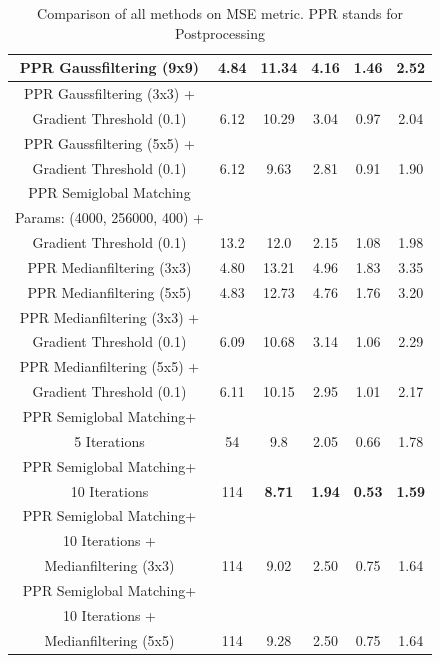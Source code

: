\documentclass  [
  paper    = a4,
  BCOR     = 10mm,
  twoside,
  fontsize = 12pt,
  fleqn,
  toc      = bibnumbered,
  toc      = listofnumbered,
  numbers  = noendperiod,
  headings = normal,
  listof   = leveldown,
  version  = 3.03
]                                       {scrreprt}
\begin{document}
\begin{table}
\begin{tabular}{|c|c|c|c|c|c|}
		PPR Gaussfiltering (9x9) & 4.84& 11.34 & 4.16 & 1.46 & 2.52 \\
		\hline
		PPR Gaussfiltering (3x3) +&&&&&\\
		 Gradient Threshold (0.1) & 6.12 & 10.29 & 3.04 & 0.97 &2.04\\
		\hline
		PPR Gaussfiltering (5x5) +&&&&&\\
		Gradient Threshold (0.1) & 6.12 & 9.63 & 2.81 & 0.91 & 1.90\\
		\hline
		PPR Semiglobal Matching&&&&&\\
		Params: (4000, 256000, 400) +&&&&&\\
		Gradient Threshold (0.1) & 13.2 &12.0 & 2.15 & 1.08 & 1.98\\
		\hline
		PPR Medianfiltering (3x3) & 4.80 & 13.21 & 4.96 & 1.83 & 3.35 \\
		\hline
		PPR Medianfiltering (5x5) & 4.83 & 12.73 & 4.76 & 1.76 & 3.20 \\
		\hline
		PPR Medianfiltering (3x3) +&&&&&\\
		Gradient Threshold (0.1) &6.09 & 10.68 & 3.14 & 1.06 & 2.29 \\
		\hline 
		PPR Medianfiltering (5x5) +&&&&&\\
		Gradient Threshold (0.1)  & 6.11& 10.15 & 2.95 & 1.01 &2.17 \\
		\hline
		PPR Semiglobal Matching+&&&&&\\
		5 Iterations & 54 & 9.8  & 2.05 & 0.66 & 1.78  \\
		\hline
		PPR Semiglobal Matching+&&&&&\\
		10 Iterations  & 114 & \textbf{8.71} & \textbf{1.94} & \textbf{0.53} & \textbf{1.59} \\
		\hline
		PPR Semiglobal Matching+&&&&&\\
		10 Iterations +&&&&&\\
		 Medianfiltering (3x3) & 114 & 9.02 & 2.50 & 0.75 & 1.64 \\
		\hline
		PPR Semiglobal Matching+&&&&&\\
		10 Iterations +&&&&&\\
		Medianfiltering (5x5) & 114 & 9.28 & 2.50 & 0.75 & 1.64 \\
		\hline
	\end{tabular}
\caption[Resumee Table]{Comparison of all methods on MSE metric. PPR stands for Postprocessing} 
\label{tab:comparison}
\end{table}
\end{document}
